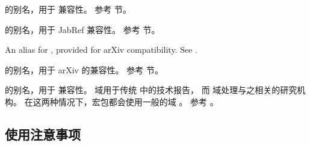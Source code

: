 \begin{fieldlist}

 的别名，用于 \BibTeX 兼容性。
参考  节。




 的别名，用于 JabRef 兼容性。
参考  节。


An alias for , provided for arXiv compatibility. See .


 的别名，用于 arXiv 的兼容性。
参考  节。




 的别名，用于 \BibTeX 兼容性。
 域用于传统 \BibTeX 中的技术报告，
而  域处理与之相关的研究机构。
在这两种情况下，\biblatex 宏包都会使用一般的域 。
参考 。

\end{fieldlist}


\subsection{使用注意事项}%
\label{bib:use}


